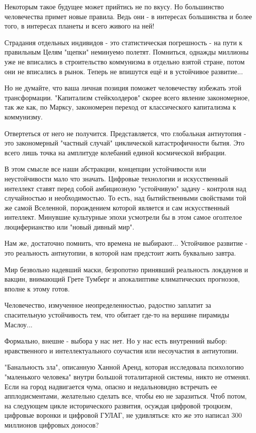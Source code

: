 Некоторым такое будущее может прийтись не по вкусу. Но большинство человечества
примет новые правила. Ведь они - в интересах большинства и более того,  в
интересах планеты и всего живого на ней!

Страдания отдельных индивидов - это статистическая погрешность -  на пути к
правильным Целям "щепки" неминуемо полетят. Помниться, однажды миллионы уже не
вписались в строительство коммунизма в отдельно взятой стране, потом они не
вписались в рынок. Теперь не впишутся ещё и в устойчивое развитие...

Но не думайте, что ваша личная позиция поможет человечеству избежать этой
трансформации. "Капитализм стейкхолдеров"  скорее всего явление закономерное,
так же  как, по Марксу, закономерен переход от классического капитализма к
коммунизму.

Отвертеться от него не получится. Представляется, что глобальная антиутопия -
это закономерный  "частный случай" циклической катастрофичности бытия. Это
всего лишь точка на амплитуде колебаний единой космической вибрации. 

В этом смысле все наши абстракции, концепции устойчивости или неустойчивости
мало что значать. Цифровые технологии и искусственный интеллект ставят перед
собой амбициозную "устойчивую"  задачу - контроля над случайностью и
необходимостью. То есть, над  бытийственными  свойствами той же самой
Вселенной, порождением которой является и сам искусственный интеллект. Минувшие
культурные эпохи усмотрели бы в этом самое оголтелое люциферианство или "новый
дивный мир".

Нам же,  достаточно помнить, что времена не выбирают... Устойчивое развитие -
это реальность антиутопии, в которой нам предстоит жить буквально завтра.

Мир безвольно надевший маски,  безропотно принявший реальность локдаунов и
вакцин,  внимающий Грете Тумберг и апокалиптике климатических прогнозов,
вполне к этому готов. 

Человечество, измученное неопределенностью,  радостно заплатит за спасительную
устойчивость тем, что обитает где-то на вершине пирамиды Маслоу...

Формально, внешне - выбора у нас нет. Но у нас есть внутренний выбор:
нравственного  и интеллектуального соучастия или несоучастия в антиутопии. 

"Банальность зла", описанную Ханной Аренд, которая исследовала  психологию
"маленького человека" внутри большой тоталитарной системы, никто не отменял.
Если на город надвигается чума, опасно и недальновидно встречать ее
апплодисментами, желательно сделать все, чтобы ею не заразиться. Чтоб потом, на
следующем цикле исторического развития,  осуждая цифровой троцкизм, цифровые
воронки  и цифровой ГУЛАГ,  не удивляться: кто же это написал 300 миллионов
цифровых доносов?

